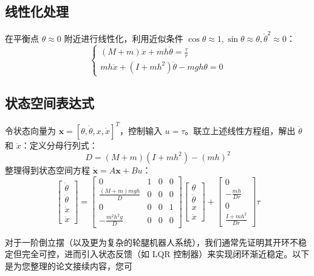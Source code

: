 \subsection{线性化处理}
在平衡点 $\theta \approx 0$ 附近进行线性化，利用近似条件 $\cos\theta \approx 1, 
\sin\theta \approx \theta, \dot{\theta}^2 \approx 0$：
\begin{equation}
\begin{cases}
(M + m)\ddot{x} + mh\ddot{\theta} = \frac{\tau}{r} \\
mh\ddot{x} + (I + mh^2)\ddot{\theta} - mgh\theta = 0
\end{cases}
\end{equation}

\subsection{状态空间表达式}
令状态向量为 $\mathbf{x} = [\theta, \dot{\theta}, x, \dot{x}]^T$，控制输入 $u = \tau$。联立上述线性方程组，解出 $\ddot{\theta}$ 和 $\ddot{x}$：定义分母行列式：$$D = (M+m)(I+mh^2) - (mh)^2$$整理得到状态空间方程 $\dot{\mathbf{x}} = A\mathbf{x} + Bu$：
\begin{equation}
\begin{bmatrix}
\dot{\theta} \\
\ddot{\theta} \\
\dot{x} \\
\ddot{x}
\end{bmatrix}
=
\begin{bmatrix}
0 & 1 & 0 & 0 \\
\frac{(M+m)mgh}{D} & 0 & 0 & 0 \\
0 & 0 & 0 & 1 \\
-\frac{m^2h^2g}{D} & 0 & 0 & 0
\end{bmatrix}
\begin{bmatrix}
\theta \\
\dot{\theta} \\
x \\
\dot{x}
\end{bmatrix}
+
\begin{bmatrix}
0 \\
-\frac{mh}{Dr} \\
0 \\
\frac{I+mh^2}{Dr}
\end{bmatrix}
\tau
\end{equation}

对于一阶倒立摆（以及更为复杂的轮腿机器人系统），我们通常先证明其开环不稳定但完全可控，进而引入状态反馈（如 LQR 控制器）来实现闭环渐近稳定。以下是为您整理的论文接续内容，您可


